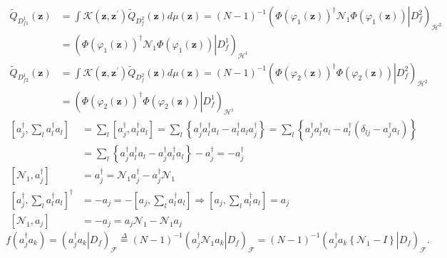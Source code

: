 \documentclass[aps,preprint]{revtex4}%
\begin{document}
\begin{align}
\tilde{Q}_{D_{f1}^{1}}\left(  \mathbf{z}\right)   &  =\int\mathcal{K}\left(
\mathbf{z,z}^{\prime}\right)  \tilde{Q}_{D_{f}^{2}}\left(  \mathbf{z}\right)
d\mu\left(  \mathbf{z}\right)  =\left(  N-1\right)  ^{-1}\left(  \left.
\Phi\left(  \varphi_{1}\left(  \mathbf{z}\right)  \right)  ^{\dagger
}\mathcal{N}_{1}\Phi\left(  \varphi_{1}\left(  \mathbf{z}\right)  \right)
\right\vert D_{f}^{2}\right)  _{\mathcal{H}^{2}}\nonumber\\
&  =\left(  \left.  \Phi\left(  \varphi_{1}\left(  \mathbf{z}\right)  \right)
^{\dagger}\mathcal{N}_{1}\Phi\left(  \varphi_{1}\left(  \mathbf{z}\right)
\right)  \right\vert D_{f}^{1}\right)  _{\mathcal{H}^{1}}%
\end{align}%
\begin{align}
\tilde{Q}_{D_{f2}^{1}}\left(  \mathbf{z}\right)   &  =\int\mathcal{K}\left(
\mathbf{z,z}^{\prime}\right)  \tilde{Q}_{D_{f}^{2}}\left(  \mathbf{z}\right)
d\mu\left(  \mathbf{z}\right)  =\left(  N-1\right)  ^{-1}\left(  \left.
\Phi\left(  \varphi_{2}\left(  \mathbf{z}\right)  \right)  ^{\dagger}%
\Phi\left(  \varphi_{2}\left(  \mathbf{z}\right)  \right)  \right\vert
D_{f}^{2}\right)  _{\mathcal{H}^{2}}\\
&  =\left(  \left.  \Phi\left(  \varphi_{2}\left(  \mathbf{z}\right)  \right)
^{\dagger}\Phi\left(  \varphi_{2}\left(  \mathbf{z}\right)  \right)
\right\vert D_{f}^{1}\right)  _{\mathcal{H}^{1}}%
\end{align}%
\begin{align}
\left[  a_{j}^{\dagger},\sum_{l}a_{l}^{\dagger}a_{l}\right]   &  =\sum
_{l}\left[  a_{j}^{\dagger},a_{l}^{\dagger}a_{l}\right]  =\sum_{l}\left\{
a_{j}^{\dagger}a_{l}^{\dagger}a_{l}-a_{l}^{\dagger}a_{l}a_{j}^{\dagger
}\right\}  =\sum_{l}\left\{  a_{j}^{\dagger}a_{l}^{\dagger}a_{l}%
-a_{l}^{\dagger}\left(  \delta_{lj}-a_{j}^{\dagger}a_{l}\right)  \right\}
\nonumber\\
&  =\sum_{l}\left\{  a_{j}^{\dagger}a_{l}^{\dagger}a_{l}-a_{j}^{\dagger}%
a_{l}^{\dagger}a_{l}\right\}  -a_{j}^{\dagger}=-a_{j}^{\dagger}\nonumber\\
\left[  \mathcal{N}_{1},a_{j}^{\dagger}\right]   &  =a_{j}^{\dagger
}=\mathcal{N}_{1}a_{j}^{\dagger}-a_{j}^{\dagger}\mathcal{N}_{1}\nonumber\\
\left[  a_{j}^{\dagger},\sum_{l}a_{l}^{\dagger}a_{l}\right]  ^{\dagger}  &
=-a_{j}=-\left[  a_{j},\sum_{l}a_{l}^{\dagger}a_{l}\right]  \Rightarrow\left[
a_{j},\sum_{l}a_{l}^{\dagger}a_{l}\right]  =a_{j}\nonumber\\
\left[  \mathcal{N}_{1},a_{j}\right]   &  =-a_{j}=a_{j}\mathcal{N}%
_{1}-\mathcal{N}_{1}a_{j}%
\end{align}%
\begin{equation}
f\left(  a_{j}^{\dagger}a_{k}\right)  =\left(  \left.  a_{j}^{\dagger}%
a_{k}\right\vert D_{f}\right)  _{\mathcal{F}}\overset{\Delta}{=}\left(
N-1\right)  ^{-1}\left(  \left.  a_{j}^{\dagger}\mathcal{N}_{1}a_{k}%
\right\vert D_{f}\right)  _{\mathcal{F}}=\left(  N-1\right)  ^{-1}\left(
\left.  a_{j}^{\dagger}a_{k}\left\{  \mathcal{N}_{1}-I\right\}  \right\vert
D_{f}\right)  _{\mathcal{F}}.
\end{equation}
\end{document}
